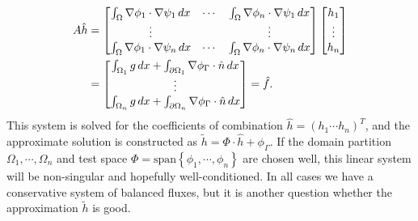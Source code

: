 \begin{equation}\label{poisson_matrix_equation}
\begin{split}
    A\hat{h}
    &= \begin{bmatrix}
            \integralentry{1}{1} & \cdots & \integralentry{1}{n} \\
            \vdots & & \vdots \\
            \integralentry{n}{1} & \cdots & \integralentry{n}{n}
    \end{bmatrix}
    \begin{bmatrix} h_1 \\ \vdots \\ h_n \end{bmatrix}
    \\
    &= \begin{bmatrix} \integralrhsentry{1} \\ \vdots \\ \integralrhsentry{n}  \end{bmatrix}
    = \hat{f}.
\end{split}
\end{equation}
This system is solved for the coefficients of combination $\hat{h} = (h_1 \cdots h_n)^T$, and the approximate
solution is constructed as $\tilde{h} = \Phi\cdot\hat{h} + \phi_\Gamma$.
If the domain partition $\Omega_1,\cdots,\Omega_n$ and test space $\Phi = \text{span}\left\{\phi_1,\cdots,\phi_n\right\}$
are chosen well, this linear system will be non-singular and hopefully well-conditioned.
In all cases we have a conservative system of balanced fluxes, but it is another question whether the approximation
$\tilde{h}$ is good.

\newpage
